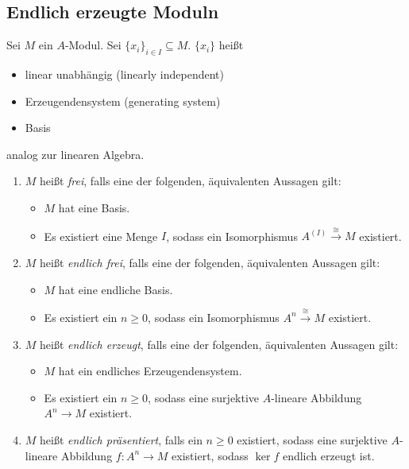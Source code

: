 \documentclass[12pt,a4paper]{scrartcl}
\theoremstyle{cplain}
\theoremstyle{cdef}
\begin{document}
\subsection{Endlich erzeugte Moduln}
\begin{defi}
	Sei $M$ ein $A$-Modul. Sei $\{x_i\}_{i\in I}\subseteq M$. $\{x_i\}$ heißt 
	\begin{itemize}
		\item linear unabhängig (linearly independent)
		\item Erzeugendensystem (generating system)
		\item Basis
	\end{itemize}
	analog zur linearen Algebra.
	\begin{enumerate}
        \item $M$ heißt \emph{frei}, falls eine der folgenden, äquivalenten Aussagen gilt:
        \begin{itemize}
            \item $M$ hat eine Basis.
            \item Es existiert eine Menge $I$, sodass ein Isomorphismus $A^{(I)}\xrightarrow{\cong}M$ existiert.
        \end{itemize}
        \item $M$ heißt \emph{endlich frei}, falls eine der folgenden, äquivalenten Aussagen gilt:
        \begin{itemize}
            \item $M$ hat eine endliche Basis.
            \item Es existiert ein $n \ge 0$, sodass ein Isomorphismus $A^{n}\xrightarrow{\cong}M$ existiert.
        \end{itemize}
        \item $M$ heißt \emph{endlich erzeugt}, falls eine der folgenden, äquivalenten Aussagen gilt:
        \begin{itemize}
            \item $M$ hat ein endliches Erzeugendensystem.
            \item Es existiert ein $n \ge 0$, sodass eine surjektive $A$-lineare Abbildung $A^{n}\to M$ existiert.
        \end{itemize}
        \item $M$ heißt \emph{endlich präsentiert}, falls ein $n \ge 0$ existiert, sodass eine surjektive $A$-lineare Abbildung $f\colon A^{n}\to M$ existiert, sodass $\ker f$ endlich erzeugt ist.
	\end{enumerate}
\end{defi}
\end{document}
